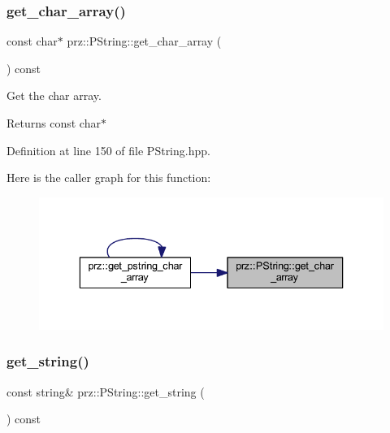 \subsubsection{\texorpdfstring{get\_char\_array()}{get\_char\_array()}}
{\footnotesize\ttfamily const char$\ast$ prz\+::\+P\+String\+::get\+\_\+char\+\_\+array (\begin{DoxyParamCaption}{ }\end{DoxyParamCaption}) const\hspace{0.3cm}{\ttfamily [inline]}}



Get the char array. 

\begin{DoxyReturn}{Returns}
const char$\ast$ 
\end{DoxyReturn}


Definition at line 150 of file P\+String.\+hpp.

Here is the caller graph for this function\+:
\nopagebreak
\begin{figure}[H]
\begin{center}
\leavevmode
\includegraphics[width=336pt]{classprz_1_1_p_string_af7507e210bb80e4cd2f8bbf3e881de99_icgraph}
\end{center}
\end{figure}
\mbox{\label{classprz_1_1_p_string_aace77edbeea5e61da3a03aa667fa6259}} 
\subsubsection{\texorpdfstring{get\_string()}{get\_string()}}
{\footnotesize\ttfamily const string\& prz\+::\+P\+String\+::get\+\_\+string (\begin{DoxyParamCaption}{ }\end{DoxyParamCaption}) const\hspace{0.3cm}{\ttfamily [inline]}}



